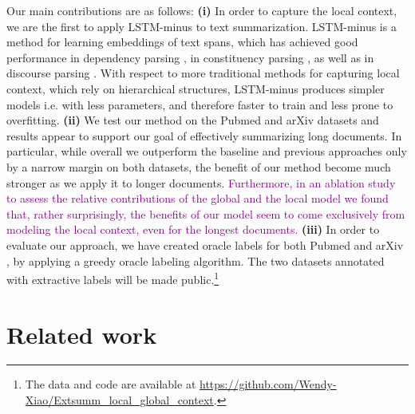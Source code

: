 Our main contributions are as follows:
{\bf (i)} In order to capture the local context, we are the first to apply LSTM-minus to text summarization. LSTM-minus is a method for learning embeddings of text spans, which
has achieved good performance in dependency parsing
\cite{lstm-minus_propose},  in constituency
parsing \cite{lstm-minus_constituency},
as well as in discourse parsing \cite{lstm-minus_discourse}. With respect to more traditional methods for capturing
local context, which rely on hierarchical
structures, LSTM-minus produces simpler
models i.e. with less parameters, and therefore faster to train and less prone to overfitting.
{\bf (ii)} We test our method on the Pubmed and arXiv datasets and results appear to support our goal of effectively summarizing long documents. In particular, while overall we outperform the baseline and previous approaches only by a narrow margin on both datasets, the benefit of our method become much stronger as we apply it to longer documents. \textcolor{purple}{Furthermore, in an ablation study to assess the relative contributions of the global and the local model we found that, rather surprisingly, the benefits of our model seem to come exclusively from modeling the local context, even for the longest documents.}\footnotemark[6]
\renewcommand{\thefootnote}{\arabic{footnote}}
{\bf (iii)} In order to evaluate our approach, we have created oracle labels for both Pubmed and arXiv \cite{discourse_long_document}, by applying a greedy oracle labeling algorithm. The two datasets annotated with extractive labels will be made public.\footnote{The data and code are available at \url{https://github.com/Wendy-Xiao/Extsumm_local_global_context}.}

\section{Related work}
